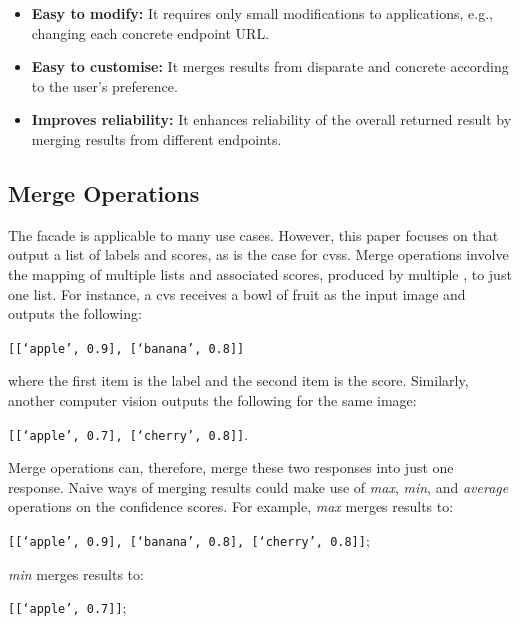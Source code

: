 \begin{itemize}
\item \textbf{Easy to modify:} It requires only small modifications to applications, e.g., changing each concrete endpoint URL.
\item \textbf{Easy to customise:} It merges results from disparate and concrete  according to the user's preference.
\item \textbf{Improves reliability:} It enhances reliability of the overall returned result by merging results from different endpoints.
\end{itemize}

\subsection{Merge Operations}\label{icwe2019:sec:merge-operations}

The  facade is applicable to many use cases.
However, this paper focuses on  that output a list of labels and scores, as is the case for \glspl{cvs}.
Merge operations involve the mapping of multiple lists and associated scores, produced by multiple , to just one list.
For instance, a \gls{cvs} receives a bowl of fruit as the input image and outputs the following:

\begin{center}
  \texttt{[[`apple', 0.9], [`banana', 0.8]]}
\end{center}

\noindent
where the first item is the label and the second item is the score. Similarly, another computer vision  outputs the following for the same image:

\begin{center}
  \texttt{[[`apple', 0.7], [`cherry', 0.8]]}.  
\end{center}

\noindent
Merge operations can, therefore, merge these two responses into just one response. Naive ways of merging results could make use of \textit{max}, \textit{min}, and \textit{average} operations on the confidence scores. For example, \textit{max} merges results to:

\begin{center}
  \texttt{[[`apple', 0.9], [`banana', 0.8], [`cherry', 0.8]]};
\end{center}

\noindent
\textit{min} merges results to:

\begin{center}
\texttt{[[`apple', 0.7]]}; 
\end{center}

